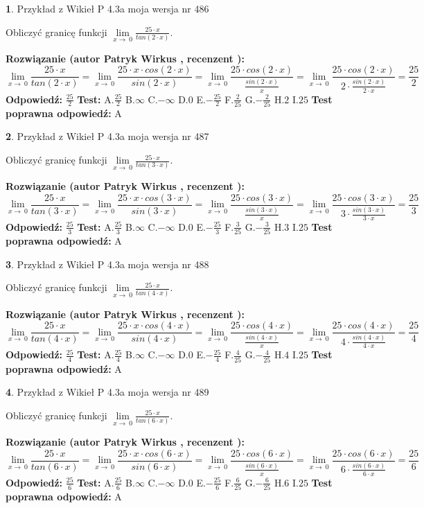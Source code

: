 \documentclass[12pt, a4paper]{article}
\theoremstyle{definition} %
\newtheorem{zad}{}
\newcommand{\zadStart}[1]{\begin{zad}#1\newline}
\newcommand{\zadStop}{\end{zad}}
\newcommand{\rozwStart}[2]{\noindent \textbf{Rozwiązanie (autor #1 , recenzent #2): }\newline}
\newcommand{\rozwStop}{\newline}
\newcommand{\odpStart}{\noindent \textbf{Odpowiedź:}\newline}
\newcommand{\odpStop}{\newline}
\newcommand{\testStart}{\noindent \textbf{Test:}\newline}
\newcommand{\testStop}{\newline}
\newcommand{\kluczStart}{\noindent \textbf{Test poprawna odpowiedź:}\newline}
\newcommand{\kluczStop}{\newline}
\begin{document}
\zadStart{Przykład z Wikieł P 4.3a moja wersja nr 486}


Obliczyć granicę funkcji $\lim\limits_{x\to\ 0}\frac{25 \cdot x}{tan(2 \cdot x)}$.
\zadStop
\rozwStart{Patryk Wirkus}{}
$$\lim\limits_{x\to\ 0}\frac{25 \cdot x}{tan(2 \cdot x)}=\lim\limits_{x\to\ 0}\frac{25 \cdot x \cdot cos(2 \cdot x)}{sin(2 \cdot x)}=\lim\limits_{x\to\ 0}\frac{25 \cdot cos(2 \cdot x)}{\frac{sin(2 \cdot x)}{x}}=\lim\limits_{x\to\ 0}\frac{25 \cdot cos(2 \cdot x)}{2 \cdot \frac{sin(2 \cdot x)}{2 \cdot x}} = \frac{25}{2}$$
\rozwStop
\odpStart
$\frac{25}{2}$
\odpStop
\testStart
A.$\frac{25}{2}$
B.$\infty$
C.$-\infty$
D.$0$
E.$-\frac{25}{2}$
F.$\frac{2}{25}$
G.$-\frac{2}{25}$
H.$2$
I.$25$
\testStop
\kluczStart
A
\kluczStop



\zadStart{Przykład z Wikieł P 4.3a moja wersja nr 487}


Obliczyć granicę funkcji $\lim\limits_{x\to\ 0}\frac{25 \cdot x}{tan(3 \cdot x)}$.
\zadStop
\rozwStart{Patryk Wirkus}{}
$$\lim\limits_{x\to\ 0}\frac{25 \cdot x}{tan(3 \cdot x)}=\lim\limits_{x\to\ 0}\frac{25 \cdot x \cdot cos(3 \cdot x)}{sin(3 \cdot x)}=\lim\limits_{x\to\ 0}\frac{25 \cdot cos(3 \cdot x)}{\frac{sin(3 \cdot x)}{x}}=\lim\limits_{x\to\ 0}\frac{25 \cdot cos(3 \cdot x)}{3 \cdot \frac{sin(3 \cdot x)}{3 \cdot x}} = \frac{25}{3}$$
\rozwStop
\odpStart
$\frac{25}{3}$
\odpStop
\testStart
A.$\frac{25}{3}$
B.$\infty$
C.$-\infty$
D.$0$
E.$-\frac{25}{3}$
F.$\frac{3}{25}$
G.$-\frac{3}{25}$
H.$3$
I.$25$
\testStop
\kluczStart
A
\kluczStop



\zadStart{Przykład z Wikieł P 4.3a moja wersja nr 488}


Obliczyć granicę funkcji $\lim\limits_{x\to\ 0}\frac{25 \cdot x}{tan(4 \cdot x)}$.
\zadStop
\rozwStart{Patryk Wirkus}{}
$$\lim\limits_{x\to\ 0}\frac{25 \cdot x}{tan(4 \cdot x)}=\lim\limits_{x\to\ 0}\frac{25 \cdot x \cdot cos(4 \cdot x)}{sin(4 \cdot x)}=\lim\limits_{x\to\ 0}\frac{25 \cdot cos(4 \cdot x)}{\frac{sin(4 \cdot x)}{x}}=\lim\limits_{x\to\ 0}\frac{25 \cdot cos(4 \cdot x)}{4 \cdot \frac{sin(4 \cdot x)}{4 \cdot x}} = \frac{25}{4}$$
\rozwStop
\odpStart
$\frac{25}{4}$
\odpStop
\testStart
A.$\frac{25}{4}$
B.$\infty$
C.$-\infty$
D.$0$
E.$-\frac{25}{4}$
F.$\frac{4}{25}$
G.$-\frac{4}{25}$
H.$4$
I.$25$
\testStop
\kluczStart
A
\kluczStop



\zadStart{Przykład z Wikieł P 4.3a moja wersja nr 489}


Obliczyć granicę funkcji $\lim\limits_{x\to\ 0}\frac{25 \cdot x}{tan(6 \cdot x)}$.
\zadStop
\rozwStart{Patryk Wirkus}{}
$$\lim\limits_{x\to\ 0}\frac{25 \cdot x}{tan(6 \cdot x)}=\lim\limits_{x\to\ 0}\frac{25 \cdot x \cdot cos(6 \cdot x)}{sin(6 \cdot x)}=\lim\limits_{x\to\ 0}\frac{25 \cdot cos(6 \cdot x)}{\frac{sin(6 \cdot x)}{x}}=\lim\limits_{x\to\ 0}\frac{25 \cdot cos(6 \cdot x)}{6 \cdot \frac{sin(6 \cdot x)}{6 \cdot x}} = \frac{25}{6}$$
\rozwStop
\odpStart
$\frac{25}{6}$
\odpStop
\testStart
A.$\frac{25}{6}$
B.$\infty$
C.$-\infty$
D.$0$
E.$-\frac{25}{6}$
F.$\frac{6}{25}$
G.$-\frac{6}{25}$
H.$6$
I.$25$
\testStop
\kluczStart
A
\kluczStop
\end{document}
